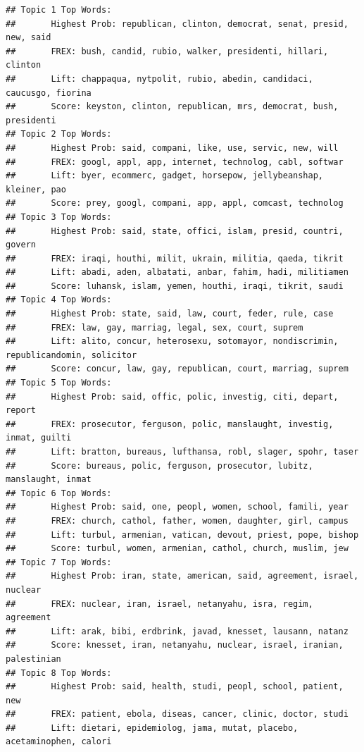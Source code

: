 \documentclass[12pt]{article}\usepackage[]{graphicx}\usepackage[]{color}
\makeatletter
\newenvironment{kframe}{%
 \def\at@end@of@kframe{}%
 \ifinner\ifhmode%
  \def\at@end@of@kframe{\end{minipage}}%
  \begin{minipage}{\columnwidth}%
 \fi\fi%
 \def\FrameCommand##1{\hskip\@totalleftmargin \hskip-\fboxsep
 \colorbox{shadecolor}{##1}\hskip-\fboxsep
     \hskip-\linewidth \hskip-\@totalleftmargin \hskip\columnwidth}%
 \MakeFramed {\advance\hsize-\width
   \@totalleftmargin\z@ \linewidth\hsize
   \@setminipage}}%
 {\par\unskip\endMakeFramed%
 \at@end@of@kframe}
\newenvironment{knitrout}{}{} %
\makeatother
\begin{document}
\begin{knitrout}
\color{fgcolor}\begin{kframe}
\begin{verbatim}
## Topic 1 Top Words:
##  	 Highest Prob: republican, clinton, democrat, senat, presid, new, said 
##  	 FREX: bush, candid, rubio, walker, presidenti, hillari, clinton 
##  	 Lift: chappaqua, nytpolit, rubio, abedin, candidaci, caucusgo, fiorina 
##  	 Score: keyston, clinton, republican, mrs, democrat, bush, presidenti 
## Topic 2 Top Words:
##  	 Highest Prob: said, compani, like, use, servic, new, will 
##  	 FREX: googl, appl, app, internet, technolog, cabl, softwar 
##  	 Lift: byer, ecommerc, gadget, horsepow, jellybeanshap, kleiner, pao 
##  	 Score: prey, googl, compani, app, appl, comcast, technolog 
## Topic 3 Top Words:
##  	 Highest Prob: said, state, offici, islam, presid, countri, govern 
##  	 FREX: iraqi, houthi, milit, ukrain, militia, qaeda, tikrit 
##  	 Lift: abadi, aden, albatati, anbar, fahim, hadi, militiamen 
##  	 Score: luhansk, islam, yemen, houthi, iraqi, tikrit, saudi 
## Topic 4 Top Words:
##  	 Highest Prob: state, said, law, court, feder, rule, case 
##  	 FREX: law, gay, marriag, legal, sex, court, suprem 
##  	 Lift: alito, concur, heterosexu, sotomayor, nondiscrimin, republicandomin, solicitor 
##  	 Score: concur, law, gay, republican, court, marriag, suprem 
## Topic 5 Top Words:
##  	 Highest Prob: said, offic, polic, investig, citi, depart, report 
##  	 FREX: prosecutor, ferguson, polic, manslaught, investig, inmat, guilti 
##  	 Lift: bratton, bureaus, lufthansa, robl, slager, spohr, taser 
##  	 Score: bureaus, polic, ferguson, prosecutor, lubitz, manslaught, inmat 
## Topic 6 Top Words:
##  	 Highest Prob: said, one, peopl, women, school, famili, year 
##  	 FREX: church, cathol, father, women, daughter, girl, campus 
##  	 Lift: turbul, armenian, vatican, devout, priest, pope, bishop 
##  	 Score: turbul, women, armenian, cathol, church, muslim, jew 
## Topic 7 Top Words:
##  	 Highest Prob: iran, state, american, said, agreement, israel, nuclear 
##  	 FREX: nuclear, iran, israel, netanyahu, isra, regim, agreement 
##  	 Lift: arak, bibi, erdbrink, javad, knesset, lausann, natanz 
##  	 Score: knesset, iran, netanyahu, nuclear, israel, iranian, palestinian 
## Topic 8 Top Words:
##  	 Highest Prob: said, health, studi, peopl, school, patient, new 
##  	 FREX: patient, ebola, diseas, cancer, clinic, doctor, studi 
##  	 Lift: dietari, epidemiolog, jama, mutat, placebo, acetaminophen, calori 

\end{verbatim}
\end{kframe}
\end{knitrout}
\end{document}
